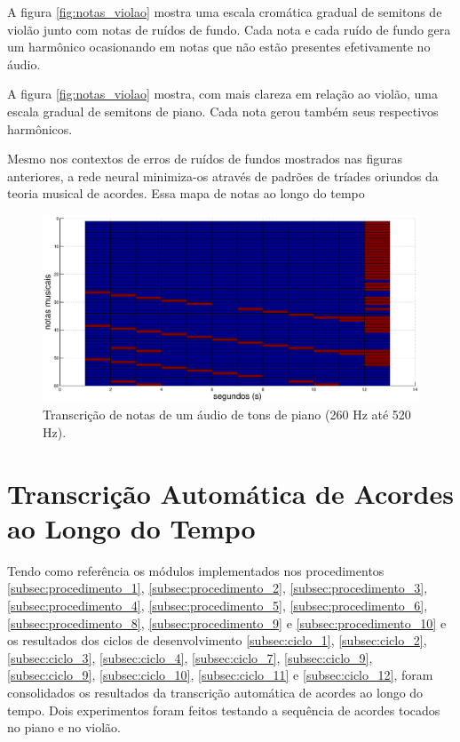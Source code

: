 A figura \ref{fig:notas_violao} mostra uma escala cromática gradual de semitons de violão junto com notas de ruídos de fundo. Cada nota e cada ruído de fundo gera um harmônico ocasionando em notas que não estão presentes efetivamente no áudio.

A figura \ref{fig:notas_violao} mostra, com mais clareza em relação ao violão, uma escala gradual de semitons de piano. Cada nota gerou também seus respectivos harmônicos. 

Mesmo nos contextos de erros de ruídos de fundos mostrados nas figuras anteriores, a rede neural minimiza-os através de padrões de tríades oriundos da teoria musical de acordes. Essa mapa de notas ao longo do tempo

\begin{figure}[h]
    \centering
    \includegraphics[keepaspectratio=true,scale=0.49]{figuras/notas_piano.eps}
  \caption{Transcrição de notas de um áudio de tons de piano (260 Hz até 520 Hz).}
  \label{fig:notas_piano}
\end{figure}

\section{Transcrição Automática de Acordes ao Longo do Tempo}
\label{sec:acordes}
Tendo como referência os módulos implementados nos procedimentos \ref{subsec:procedimento_1}, \ref{subsec:procedimento_2}, \ref{subsec:procedimento_3}, \ref{subsec:procedimento_4}, \ref{subsec:procedimento_5}, \ref{subsec:procedimento_6}, \ref{subsec:procedimento_8}, \ref{subsec:procedimento_9} e \ref{subsec:procedimento_10} e os resultados dos ciclos de desenvolvimento \ref{subsec:ciclo_1}, \ref{subsec:ciclo_2}, \ref{subsec:ciclo_3}, \ref{subsec:ciclo_4}, \ref{subsec:ciclo_7}, \ref{subsec:ciclo_9}, \ref{subsec:ciclo_9}, \ref{subsec:ciclo_10}, \ref{subsec:ciclo_11} e \ref{subsec:ciclo_12}, foram consolidados os resultados da transcrição automática de acordes ao longo do tempo. Dois experimentos foram feitos testando a sequência de acordes tocados no piano e no violão. 


